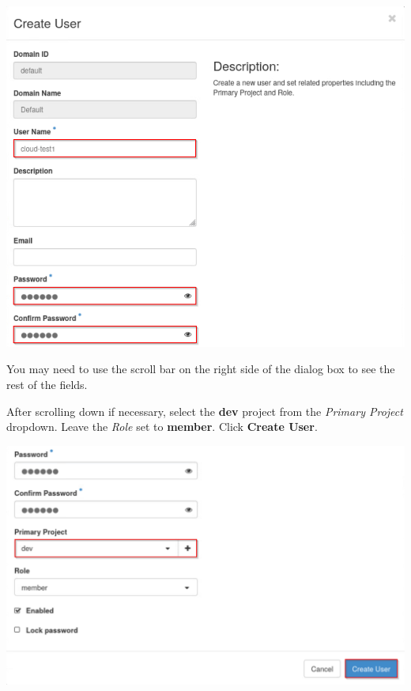 \documentclass[letterpaper, 12pt]{article}
\begin{document}
\begin{enumerate}
\begin{labstep}
        \begin{center}
            \includegraphics[width=\linewidth]{images/part3/step6.png}
        \end{center}
    \end{labstep}

    \begin{tipbox}
        You may need to use the scroll bar on the right side of the dialog box to see the rest of the fields.
    \end{tipbox}

    \begin{labstep}\label{it:create-user-end}
        After scrolling down if necessary, select the \textbf{dev} project from the \textit{Primary Project} dropdown.
        Leave the \textit{Role} set to \textbf{member}.
        Click \textbf{Create User}.

        \begin{center}
            \includegraphics[width=\linewidth]{images/part3/step7.png}
        \end{center}
    \end{labstep}


\end{enumerate}
\end{document}

